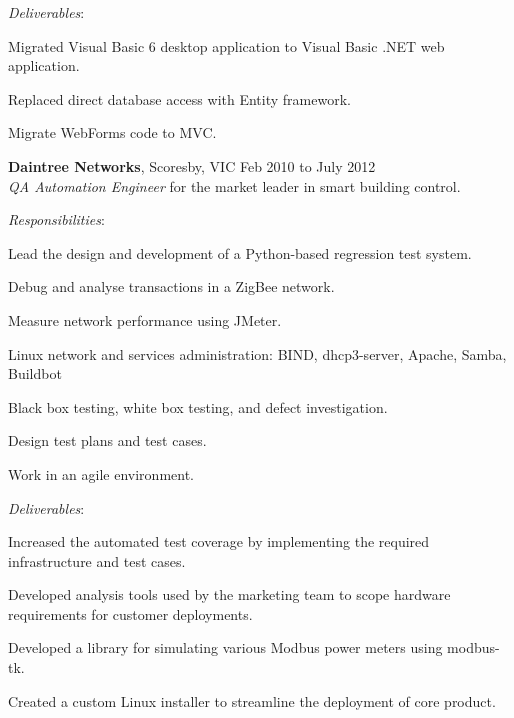 \documentclass[line,margin]{res}
\begin{document}
\begin{resume}
        \textit{Deliverables}:
        \begin{list}{}{\leftmargin=1em \itemsep=-2pt}
            \item{Migrated Visual Basic 6 desktop application to Visual Basic .NET web application.}
            \item{Replaced direct database access with Entity framework.}
            \item{Migrate WebForms code to MVC.}
        \end{list}

        \textbf{Daintree Networks}, Scoresby, VIC \hfill Feb 2010 to July 2012 \\
        \textit{QA Automation Engineer} for the market leader in smart building control.

        \textit{Responsibilities}:
        \begin{list}{}{\leftmargin=1em \itemsep=-2pt}
            \item{Lead the design and development of a Python-based regression test system.}
            \item{Debug and analyse transactions in a ZigBee network.}
            \item{Measure network performance using JMeter.}
            \item{Linux network and services administration: BIND, dhcp3-server, Apache, Samba, Buildbot}
            \item{Black box testing, white box testing, and defect investigation.}
            \item{Design test plans and test cases.}
            \item{Work in an agile environment.}
        \end{list}
             
        \textit{Deliverables}:
        \begin{list}{}{\leftmargin=1em \itemsep=-2pt}
            \item{Increased the automated test coverage by implementing the required infrastructure and
            test cases.}
            \item{Developed analysis tools used by the marketing team to scope hardware
            requirements for customer deployments.}
            \item{Developed a library for simulating various Modbus power meters using modbus-tk.}
            \item{Created a custom Linux installer to streamline the deployment of core product.}
        \end{list}


\end{resume}
\end{document}
